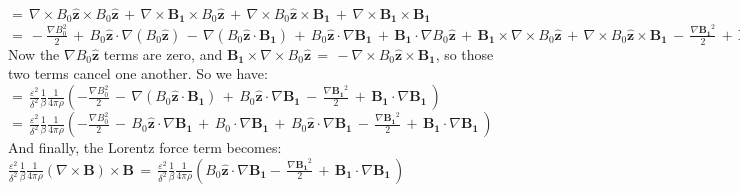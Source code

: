\documentclass[letterpaper,12pt]{article}
\begin{document}
$= \, \nabla \times B_0 \mathbf{\hat{z}} \times B_0 \mathbf{\hat{z}} \, +\, \nabla \times \mathbf{B_1} \times B_0 \mathbf{\hat{z}} \, + \, \nabla \times B_0 \mathbf{\hat{z}} \times \mathbf{B_1} \, + \, \nabla \times \mathbf{B_1} \times \mathbf{B_1}$\\

$= \, -\frac{\nabla B_0^2}{2} \, + \, B_0 \mathbf{\hat{z}} \cdot \nabla \left(B_0 \mathbf{\hat{z}}\right) \, - \, \nabla\left(B_0 \mathbf{\hat{z}} \cdot \mathbf{B_1}\right) \, + \, B_0 \mathbf{\hat{z}} \cdot \nabla \mathbf{B_1} \, + \, \mathbf{B_1} \cdot \nabla B_0 \mathbf{\hat{z}} \, + \, \mathbf{B_1} \times \nabla \times B_0 \mathbf{\hat{z}} \, + \, \nabla \times B_0 \mathbf{\hat{z}} \times \mathbf{B_1} \, - \, \frac{\nabla \mathbf{B_1}^2}{2} \, + \, \mathbf{B_1} \cdot \nabla \mathbf{B_1}$ \\

Now the $\nabla B_0 \mathbf{\hat{z}}$ terms are zero, and $\mathbf{B_1} \times \nabla \times B_0 \mathbf{\hat{z}} \, = \, - \nabla \times B_0 \mathbf{\hat{z}} \times \mathbf{B_1}$, so those two terms cancel one another. So we have: \\

$ = \, \frac{\varepsilon^2}{\delta^2} \frac{1}{\beta} \frac{1}{4 \pi \rho} \left(-\frac{\nabla B_0^2}{2} \, - \, \nabla \left(B_0 \mathbf{\hat{z}}\cdot \mathbf{B_1}\right)\, + \, B_0 \mathbf{\hat{z}} \cdot \nabla \mathbf{B_1} \, - \, \frac{\nabla \mathbf{B_1}^2}{2} \, + \, \mathbf{B_1}\cdot \nabla \mathbf{B_1} \, \right)$ \\

$ = \, \frac{\varepsilon^2}{\delta^2} \frac{1}{\beta} \frac{1}{4 \pi \rho} \left(-\frac{\nabla B_0^2}{2} \, - \, B_0 \mathbf{\hat{z}} \cdot \nabla \mathbf{B_1} \, + \, B_0 \cdot \nabla \mathbf{B_1} \,+ \, B_0 \mathbf{\hat{z}} \cdot \nabla \mathbf{B_1} \, - \, \frac{\nabla\mathbf{B_1}^2}{2} \, + \, \mathbf{B_1}\cdot \nabla \mathbf{B_1} \, \right)$ \\

And finally, the Lorentz force term becomes: \\

$\frac{\varepsilon^2}{\delta^2} \frac{1}{\beta} \frac{1}{4 \pi \rho} \left( \nabla \times \mathbf{B} \right) \times \mathbf{B} \, = \, \frac{\varepsilon^2}{\delta^2} \frac{1}{\beta} \frac{1}{4 \pi \rho} \left(B_0 \mathbf{\hat{z}} \cdot \nabla \mathbf{B_1} - \, \frac{\nabla \mathbf{B_1}^2}{2} \, + \, \mathbf{B_1}\cdot \nabla \mathbf{B_1} \, \right)$ \\
\end{document}

